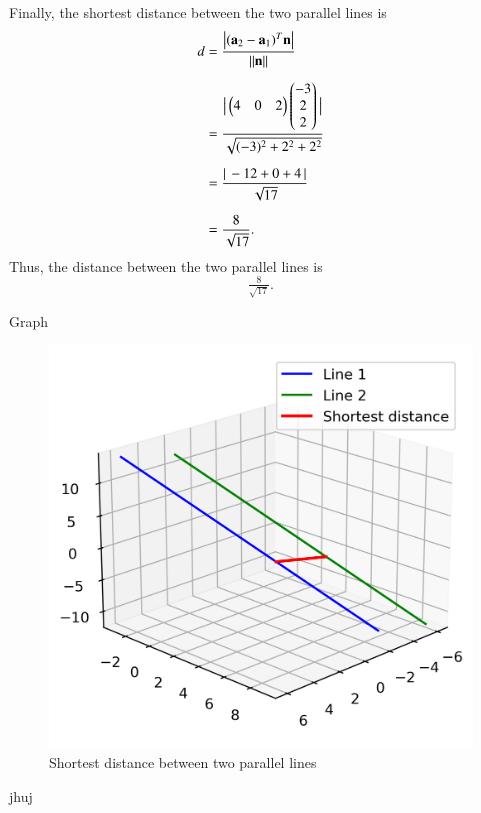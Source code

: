 \documentclass{beamer}
\begin{document}
\begin{frame}
Finally, the shortest distance between the two parallel lines is
\begin{align}
    d &= \frac{\big| (\mathbf{a}_2 - \mathbf{a}_1)^T \mathbf{n} \big|}{\|\mathbf{n}\|} \\[6pt]
      &= \frac{\big| \begin{pmatrix}4 & 0 & 2\end{pmatrix} \begin{pmatrix}-3 \\ 2 \\ 2\end{pmatrix} \big|}{\sqrt{(-3)^2 + 2^2 + 2^2}} \\[6pt]
      &= \frac{|\, -12 + 0 + 4 \,|}{\sqrt{17}} \\[6pt]
      &= \frac{8}{\sqrt{17}}.
\end{align}
Thus, the distance between the two parallel lines is
\[
\boxed{\tfrac{8}{\sqrt{17}}}.
\]
\end{frame}
\begin{frame}{Graph}
\begin{figure}[h]
    \centering
    \includegraphics[width=0.7\linewidth]{figures/shortest_distance.png}
    \caption{Shortest distance between two parallel lines}
    \label{fig:placeholder}
\end{figure}

jhuj

\end{frame}
\end{document}
